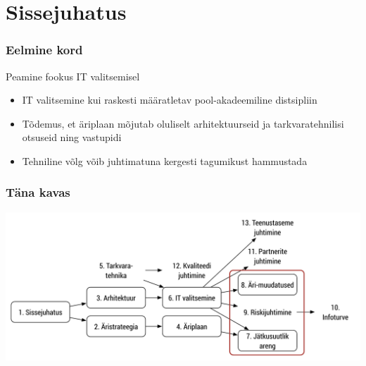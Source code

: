 

\maketitle

\section{Sissejuhatus}
\begin{frame}[fragile]
  \frametitle{Eelmine kord}
  Peamine fookus IT valitsemisel
	\begin{itemize}
		\item IT valitsemine kui raskesti määratletav pool-akadeemiline distsipliin
		\item Tõdemus, et äriplaan mõjutab oluliselt arhitektuurseid ja tarkvaratehnilisi otsuseid ning vastupidi
		\item Tehniline võlg võib juhtimatuna kergesti tagumikust hammustada
	\end{itemize}
\end{frame}

\begin{frame}[fragile]
  \frametitle{Täna kavas}
		\includegraphics[width=\textwidth]{aine_struktuur_kolmas.pdf}
\end{frame}

